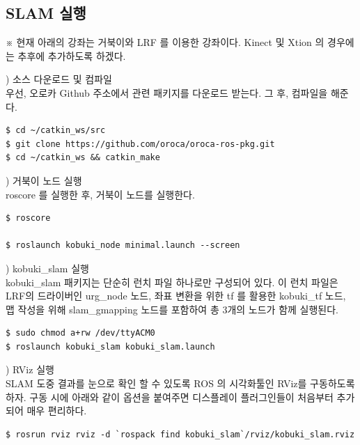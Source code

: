 \subsection{SLAM 실행}

※ 현재 아래의 강좌는 거북이와 LRF 를 이용한 강좌이다. Kinect 및 Xtion 의 경우에는 추후에 추가하도록 하겠다.

\setcounter{num}{0}

\vspace{\baselineskip}
\noindent
{}
\thenum) 소스 다운로드 및 컴파일\\
우선, 오로카 Github 주소에서 관련 패키지를 다운로드 받는다. 그 후, 컴파일을 해준다.
\vspace{\baselineskip}
\begin{lstlisting}[language=ROS]
$ cd ~/catkin_ws/src
$ git clone https://github.com/oroca/oroca-ros-pkg.git
$ cd ~/catkin_ws && catkin_make
\end{lstlisting}

\vspace{\baselineskip}
\noindent
{}
\thenum) 거북이 노드 실행\\
roscore 를 실행한 후, 거북이 노드를 실행한다.

\vspace{\baselineskip}
\begin{lstlisting}[language=ROS]
$ roscore

$ roslaunch kobuki_node minimal.launch --screen
\end{lstlisting}

\vspace{\baselineskip}
\noindent
{}
\thenum) kobuki\_slam 실행\\
kobuki\_slam 패키지는 단순히 런치 파일 하나로만 구성되어 있다. 이 런치 파일은 LRF의 드라이버인 urg\_node 노드, 좌표 변환을 위한 tf 를 활용한 kobuki\_tf 노드, 맵 작성을 위해 slam\_gmapping 노드를 포함하여 총 3개의 노드가 함께 실행된다.
\vspace{\baselineskip}
\begin{lstlisting}[language=ROS]
$ sudo chmod a+rw /dev/ttyACM0
$ roslaunch kobuki_slam kobuki_slam.launch
\end{lstlisting}

\vspace{\baselineskip}
\noindent
{}
\thenum) RViz 실행\\
SLAM 도중 결과를 눈으로 확인 할 수 있도록 ROS 의 시각화툴인 RViz를 구동하도록 하자. 구동 시에 아래와 같이 옵션을 붙여주면 디스플레이 플러그인들이 처음부터 추가되어 매우 편리하다.
\vspace{\baselineskip}
\begin{lstlisting}[language=ROS]
$ rosrun rviz rviz -d `rospack find kobuki_slam`/rviz/kobuki_slam.rviz
\end{lstlisting}


